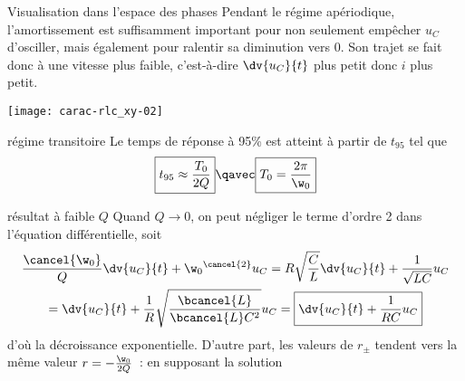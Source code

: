 \documentclass[../main/main.tex]{subfiles}
\begin{document}
\begin{NCexem}[width=\linewidth, sidebyside, righthand ratio=.4]
    {Visualisation dans l'espace des phases}
    Pendant le régime apériodique, l'amortissement est suffisamment important
    pour non seulement empêcher $u_C$ d'osciller, mais également pour ralentir
    sa diminution vers $0$. Son trajet se fait donc à une vitesse plus faible,
    c'est-à-dire $\dv{u_C}{t}$ plus petit donc $i$ plus petit.
    \tcblower
    \begin{center}
        \texttt{[image: carac-rlc\_xy-02]}
    \end{center}
\end{NCexem}

\begin{tcbraster}[raster columns=2, raster equal height=rows]
    \begin{tcolorbox}[blankest, raster multicolumn=1, space to=\myspace]
        \begin{tcbraster}[raster columns=1]
            \begin{prop}[label=prop:transiaper, add to natural height=\myspace]
                {régime transitoire}
                Le temps de réponse à 95\% est atteint à partir de $t_{95}$ tel que
                \begin{equation*}
                    \boxed{t_{95} \approx \frac{T_0}{2Q}} \qavec \boxed{T_0 =
                    \frac{2\pi}{\w_0}}
                \end{equation*}
            \end{prop}
            \begin{impo}[label=impo:aperpetitQ]{résultat à faible $Q$}
                Quand $Q \longrightarrow 0$, on peut négliger le terme d'ordre 2
                dans l'équation différentielle, soit
                \begin{gather*}
                    \frac{\cancel{\w_0}}{Q}\dv{u_C}{t} +
                        \w_0{}^{\cancel{2}}u_C = R \sqrt{\frac{C}{L}} \dv{u_C}{t} +
                    \frac{1}{\sqrt{LC}}u_C \\
                    =
                    \dv{u_C}{t} + \frac{1}{R}
                    \sqrt{\frac{\bcancel{L}}{\bcancel{L}C^2}} u_C 
                    =
                    \boxed{ \dv{u_C}{t} +
                        \frac{1}{RC} u_C}
                \end{gather*}
                d'où la décroissance exponentielle. D'autre part,
                les valeurs de $r_\pm$ tendent vers la
                même valeur $r = - \frac{\w_0}{2Q}$~: en supposant la solution

\end{impo}
\end{tcbraster}
\end{tcolorbox}
\end{tcbraster}
\end{document}
